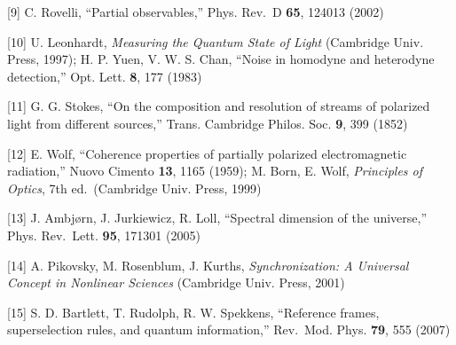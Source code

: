 \documentclass[
  a4paper,
]{article}
\begin{document}
{[}9{]} C. Rovelli, ``Partial observables,'' Phys. Rev.~D \textbf{65},
124013 (2002)

{[}10{]} U. Leonhardt, \emph{Measuring the Quantum State of Light}
(Cambridge Univ. Press, 1997); H. P. Yuen, V. W. S. Chan, ``Noise in
homodyne and heterodyne detection,'' Opt. Lett. \textbf{8}, 177 (1983)

{[}11{]} G. G. Stokes, ``On the composition and resolution of streams of
polarized light from different sources,'' Trans. Cambridge Philos. Soc.
\textbf{9}, 399 (1852)

{[}12{]} E. Wolf, ``Coherence properties of partially polarized
electromagnetic radiation,'' Nuovo Cimento \textbf{13}, 1165 (1959); M.
Born, E. Wolf, \emph{Principles of Optics}, 7th ed.~(Cambridge Univ.
Press, 1999)

{[}13{]} J. Ambjørn, J. Jurkiewicz, R. Loll, ``Spectral dimension of the
universe,'' Phys. Rev.~Lett. \textbf{95}, 171301 (2005)

{[}14{]} A. Pikovsky, M. Rosenblum, J. Kurths, \emph{Synchronization: A
Universal Concept in Nonlinear Sciences} (Cambridge Univ. Press, 2001)

{[}15{]} S. D. Bartlett, T. Rudolph, R. W. Spekkens, ``Reference frames,
superselection rules, and quantum information,'' Rev.~Mod. Phys.
\textbf{79}, 555 (2007)
\end{document}

